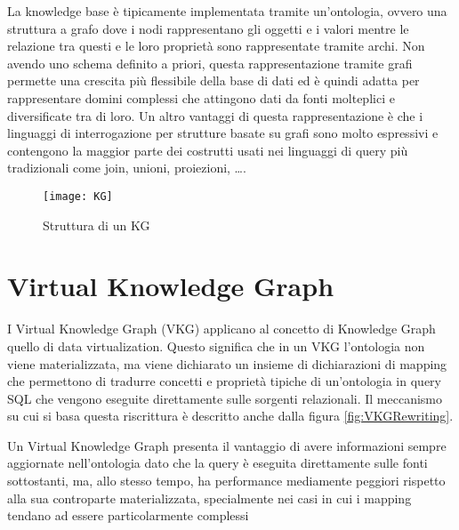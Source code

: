 La knowledge base è tipicamente implementata tramite un'ontologia, ovvero una struttura a grafo dove i nodi rappresentano gli oggetti e i valori mentre le relazione tra questi 
e le loro proprietà sono rappresentate tramite archi. Non avendo uno schema definito a priori, questa rappresentazione tramite grafi permette una crescita più flessibile della base di dati ed è quindi adatta
per rappresentare domini complessi che attingono dati da fonti molteplici e diversificate tra di loro. Un altro vantaggi di questa rappresentazione è che i linguaggi di interrogazione per strutture basate su grafi 
sono molto espressivi e contengono la maggior parte dei costrutti usati nei linguaggi di query più tradizionali come join, unioni, proiezioni, \dots \cite{KGIntro}.


\begin{figure}[ht]
    \centering
    \texttt{[image: KG]}
    \caption{Struttura di un KG}
    \label{fig:KG}
\end{figure}


\section{Virtual Knowledge Graph}
\label{sec:vkg_description}
I Virtual Knowledge Graph (VKG) applicano al concetto di Knowledge Graph quello di data virtualization. Questo significa che in un VKG l'ontologia non viene materializzata, ma viene dichiarato un insieme di dichiarazioni 
di mapping che permettono di tradurre concetti e proprietà tipiche di un'ontologia in query SQL che vengono eseguite direttamente sulle sorgenti relazionali. Il meccanismo su cui si basa questa riscrittura è descritto 
anche dalla figura \ref{fig:VKGRewriting}.

Un Virtual Knowledge Graph presenta il vantaggio di avere informazioni sempre aggiornate nell'ontologia dato che la query è eseguita direttamente sulle fonti sottostanti, ma, allo stesso tempo, ha performance 
mediamente peggiori rispetto alla sua controparte materializzata, specialmente nei casi in cui i mapping tendano ad essere particolarmente complessi \cite{VKGMedical}

